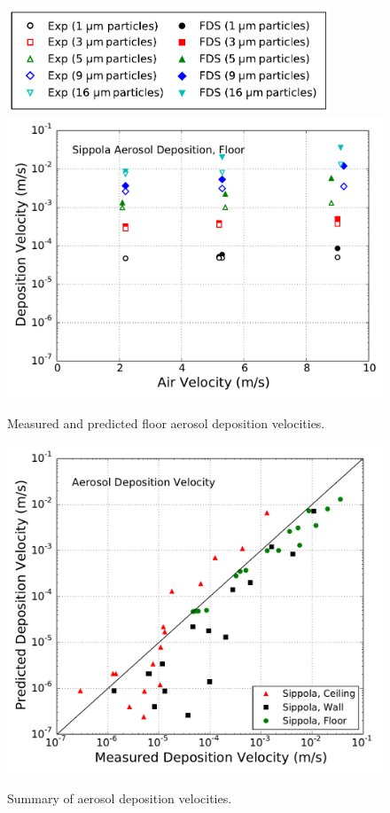 \begin{figure}[p]
\includegraphics[width=3.8in]{Fig_Sippola_Aerosol_Deposition_Legend.pdf} \\
\includegraphics[width=5.0in]{Fig_Sippola_Aerosol_Floor_Deposition.pdf}
\caption[Floor aerosol deposition velocities]
{Measured and predicted floor aerosol deposition velocities.}
\label{fig:Sippola_Aerosol_Deposition_Velocity_3}
\end{figure}

\begin{figure}[!ht]
\includegraphics[width=5.0in]{Fig_Sippola_Aerosol_Deposition_Velocity_Scatter.pdf} \\
\caption[Summary of aerosol deposition velocities]
{Summary of aerosol deposition velocities.}
\label{fig:Summary_Aerosol_Deposition_Velocity}
\end{figure}

